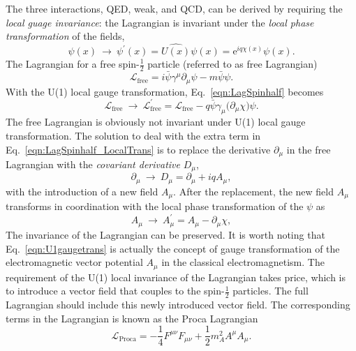 The three interactions, QED, weak, and QCD, can be derived by requiring the \emph{local guage invariance}: the Lagrangian is invariant under the \emph{local phase transformation} of the fields,
\begin{equation}
\psi(x) \ \to\ \psi^{\prime}(x) = \hat{U(x)}\psi(x) = \mathrm{e}^{iq\chi(x)}\psi(x).
\end{equation}
The Lagrangian for a free spin-$\frac{1}{2}$ particle (referred to as free Lagrangian)
\begin{equation}
\label{eqn:LagSpinhalf}
\mathcal{L}_{\text{free}}=i\bar{\psi}\gamma^{\mu}\partial_{\mu}\psi-m\bar{\psi}\psi.
\end{equation}
With the U(1) local gauge transformation, Eq.~\ref{eqn:LagSpinhalf} becomes
\begin{equation}
\label{eqn:LagSpinhalf_LocalTrans}
\mathcal{L}_{\text{free}}\ \to\ \mathcal{L}_{\text{free}}^{\prime} = \mathcal{L}_{\text{free}} - q\bar{\psi}\gamma_{\mu}\big(\partial_{\mu}\chi\big)\psi.
\end{equation}
The free Lagrangian is obviously not invariant under U(1) local gauge transformation. 
The solution to deal with the extra term in Eq.~\ref{eqn:LagSpinhalf_LocalTrans} is to replace the derivative $\partial_{\mu}$ in the free Lagrangian with the \emph{covariant derivative} $D_{\mu}$,
\begin{equation}
\label{eqn:covderivative}
\partial_{\mu}\ \to\ D_{\mu}=\partial_{\mu}+iqA_{\mu},
\end{equation}
with the introduction of a new field $A_{\mu}$. 
After the replacement, the new field $A_{\mu}$ transforms in coordination with the local phase transformation of the $\psi$ as
\begin{equation}
\label{eqn:U1gaugetrans}
A_{\mu}\ \to\ A_{\mu}^{\prime}=A_{\mu}-\partial_{\mu}\chi,
\end{equation}
The invariance of the Lagrangian can be preserved. It is worth noting that Eq.~\ref{eqn:U1gaugetrans} is actually the concept of gauge transformation of the electromagnetic vector potential $A_{\mu}$ in the classical electromagnetism. The requirement of the U(1) local invariance of the Lagrangian takes price, which is to introduce a vector field that couples to the spin-$\frac{1}{2}$ particles. The full Lagrangian should include this newly introduced vector field. The corresponding terms in the Lagrangian is known as the Proca Lagrangian
\begin{equation}
\label{eqn:LagProca}
\mathcal{L}_{\text{Proca}}=-\frac{1}{4}F^{\mu\nu}F_{\mu\nu}+\frac{1}{2}m_{A}^{2}A^{\mu}A_{\mu}.
\end{equation}
